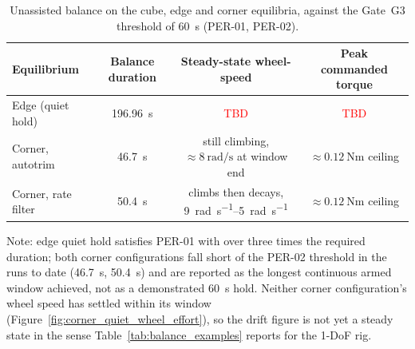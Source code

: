 \begin{table}[htbp]
\centering
\caption[3-DoF unassisted balance results]{Unassisted balance on the cube,
edge and corner equilibria, against the Gate~G3 threshold of
\qty{60}{\second} (PER-01, PER-02).}
\label{tab:balance_3dof_template}
\begin{tabular}{lccc}
\toprule
Equilibrium & Balance duration & Steady-state wheel-speed & Peak commanded torque \\
\midrule
Edge (quiet hold) & \qty{196.96}{\second} & \textcolor{red}{TBD} & \textcolor{red}{TBD} \\
Corner, autotrim   & \qty{46.7}{\second} & still climbing, $\approx\qty{8}{\radian\per\second}$ at window end & $\approx\qty{0.12}{\newton\metre}$ ceiling \\
Corner, rate filter & \qty{50.4}{\second} & climbs then decays, \qtyrange{9}{5}{\radian\per\second} & $\approx\qty{0.12}{\newton\metre}$ ceiling \\
\bottomrule
\end{tabular}
\begin{minipage}{\linewidth}
\vspace{4pt}
\footnotesize
Note: edge quiet hold satisfies PER-01 with over three times the required
duration; both corner configurations fall short of the PER-02 threshold in
the runs to date (\qty{46.7}{\second}, \qty{50.4}{\second}) and are reported
as the longest continuous armed window achieved, not as a demonstrated 60~s
hold. Neither corner configuration's wheel speed has settled within its
window (Figure~\ref{fig:corner_quiet_wheel_effort}), so the drift figure is
not yet a steady state in the sense Table~\ref{tab:balance_examples} reports
for the 1-DoF rig.
\end{minipage}
\end{table}

